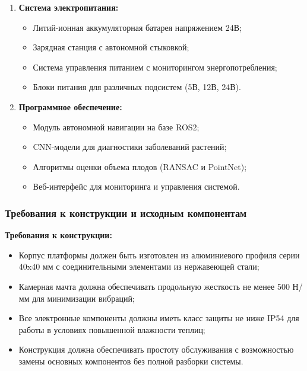 \documentclass[12pt,a4paper]{article}
\begin{document}
\begin{enumerate}
\item \textbf{Система электропитания:}
   \begin{itemize}
   \item Литий-ионная аккумуляторная батарея напряжением 24В;
   \item Зарядная станция с автономной стыковкой;
   \item Система управления питанием с мониторингом энергопотребления;
   \item Блоки питания для различных подсистем (5В, 12В, 24В).
   \end{itemize}

\item \textbf{Программное обеспечение:}
   \begin{itemize}
   \item Модуль автономной навигации на базе ROS2;
   \item CNN-модели для диагностики заболеваний растений;
   \item Алгоритмы оценки объема плодов (RANSAC и PointNet);
   \item Веб-интерфейс для мониторинга и управления системой.
   \end{itemize}
\end{enumerate}

\subsubsection{Требования к конструкции и исходным компонентам}

\textbf{Требования к конструкции:}
\begin{itemize}
\item Корпус платформы должен быть изготовлен из алюминиевого профиля серии 40x40 мм с соединительными элементами из нержавеющей стали;
\item Камерная мачта должна обеспечивать продольную жесткость не менее 500 Н/мм для минимизации вибраций;
\item Все электронные компоненты должны иметь класс защиты не ниже IP54 для работы в условиях повышенной влажности теплиц;
\item Конструкция должна обеспечивать простоту обслуживания с возможностью замены основных компонентов без полной разборки системы.
\end{itemize}
\end{document}
